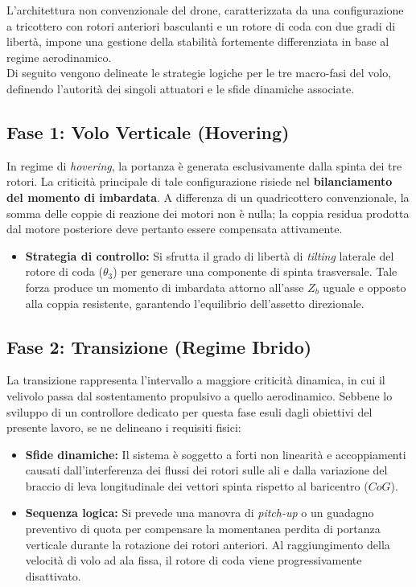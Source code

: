 L'architettura non convenzionale del drone, caratterizzata da una configurazione a tricottero con rotori anteriori basculanti e un rotore di coda con due gradi di libertà, impone una gestione della stabilità fortemente differenziata in base al regime aerodinamico. 
\\Di seguito vengono delineate le strategie logiche per le tre macro-fasi del volo, definendo l'autorità dei singoli attuatori e le sfide dinamiche associate.

\subsection{Fase 1: Volo Verticale (Hovering)}
In regime di \textit{hovering}, la portanza è generata esclusivamente dalla spinta dei tre rotori. La criticità principale di tale configurazione risiede nel \textbf{bilanciamento del momento di imbardata}. 
A differenza di un quadricottero convenzionale, la somma delle coppie di reazione dei motori non è nulla; la coppia residua prodotta dal motore posteriore deve pertanto essere compensata attivamente.
\begin{itemize}
    \item \textbf{Strategia di controllo:} Si sfrutta il grado di libertà di \textit{tilting} laterale del rotore di coda ($\theta_3$) per generare una componente di spinta trasversale. Tale forza produce un momento di imbardata attorno all'asse $Z_b$ uguale e opposto alla coppia resistente, garantendo l'equilibrio dell'assetto direzionale.
\end{itemize}

\subsection{Fase 2: Transizione (Regime Ibrido)}
La transizione rappresenta l'intervallo a maggiore criticità dinamica, in cui il velivolo passa dal sostentamento propulsivo a quello aerodinamico. Sebbene lo sviluppo di un controllore dedicato per questa fase esuli dagli obiettivi del presente lavoro, se ne delineano i requisiti fisici:
\begin{itemize}
    \item \textbf{Sfide dinamiche:} Il sistema è soggetto a forti non linearità e accoppiamenti causati dall'interferenza dei flussi dei rotori sulle ali e dalla variazione del braccio di leva longitudinale dei vettori spinta rispetto al baricentro ($CoG$).
    \item \textbf{Sequenza logica:} Si prevede una manovra di \textit{pitch-up} o un guadagno preventivo di quota per compensare la momentanea perdita di portanza verticale durante la rotazione dei rotori anteriori. Al raggiungimento della velocità di volo ad ala fissa, il rotore di coda viene progressivamente disattivato.
\end{itemize}

